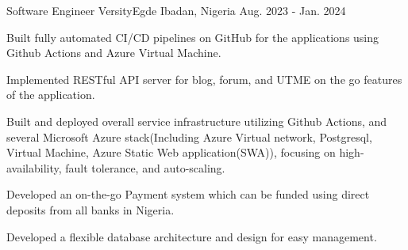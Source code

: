 

\begin{cventries}

  \cventry
    {Software Engineer} %
    {VersityEgde} %
    {Ibadan, Nigeria} %
    {Aug. 2023 - Jan. 2024} %
    {
      \begin{cvitems} %
        \item {Built fully automated CI/CD pipelines on GitHub for the applications using Github Actions and Azure Virtual Machine.}
        \item {Implemented RESTful API server for blog, forum, and UTME on the go features of the application.}
        \item {Built and deployed overall service infrastructure utilizing Github Actions, and several Microsoft Azure stack(Including Azure Virtual network, Postgresql, Virtual Machine, Azure Static Web application(SWA)), focusing on high-availability, fault tolerance, and auto-scaling.}
        \item {Developed an on-the-go Payment system which can be funded using direct deposits from all banks in Nigeria.}
        \item {Developed a flexible database architecture and design for easy management.}
      \end{cvitems}
    }

\end{cventries}
